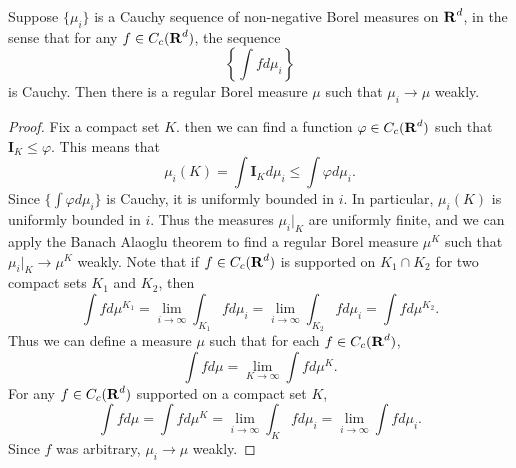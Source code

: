 \begin{lemma} \label{weakstarcompleteness}
	Suppose $\{ \mu_i \}$ is a Cauchy sequence of non-negative Borel measures on $\operatorname{\mathbf{R}}^d$, in the sense that for any $f \in C_c(\operatorname{\mathbf{R}}^d)$, the sequence
	\[ \left\{ \int f d\mu_i \right\} \]
	is Cauchy. Then there is a regular Borel measure $\mu$ such that $\mu_i \to \mu$ weakly.
\end{lemma}
\begin{proof}
	Fix a compact set $K$. then we can find a function $\varphi \in C_c(\operatorname{\mathbf{R}}^d)$ such that $\mathbf{I}_K \leq \varphi$. This means that
	\[ \mu_i(K) = \int \mathbf{I}_K d\mu_i \leq \int \varphi d\mu_i. \]
	Since $\{ \int \varphi d\mu_i \}$ is Cauchy, it is uniformly bounded in $i$. In particular, $\mu_i(K)$ is uniformly bounded in $i$. Thus the measures $\mu_i|_K$ are uniformly finite, and we can apply the Banach Alaoglu theorem to find a regular Borel measure $\mu^K$ such that $\mu_i|_K \to \mu^K$ weakly. Note that if $f \in C_c(\operatorname{\mathbf{R}}^d)$ is supported on $K_1 \cap K_2$ for two compact sets $K_1$ and $K_2$, then
	\[ \int f d\mu^{K_1} = \lim_{i \to \infty} \int_{K_1} f d\mu_i = \lim_{i \to \infty} \int_{K_2} f d \mu_i = \int f d\mu^{K_2}. \]
	Thus we can define a measure $\mu$ such that for each $f \in C_c(\operatorname{\mathbf{R}}^d)$,
	\[ \int f d\mu = \lim_{K \to \infty} \int f d\mu^K. \]
	For any $f \in C_c(\operatorname{\mathbf{R}}^d)$ supported on a compact set $K$,
	\[ \int f d\mu = \int f d\mu^K = \lim_{i \to \infty} \int_K f d\mu_i = \lim_{i \to \infty} \int f d\mu_i. \]
	Since $f$ was arbitrary, $\mu_i \to \mu$ weakly.
\end{proof}

\begin{comment}

\begin{lemma}
	For each $k$, let $\mathcal{E}_k$ be a finite collection of closed sets, such that for any $A \in \mathcal{E}_{k+1}$, we fix $A^* \in \mathcal{E}_k$ such that $A \subset A^*$. Suppose that for any $A' \in \mathcal{E}_k$, there is at least one $A \in \mathcal{E}_{k+1}$ such that $A^* = A'$. Let $f: \bigcup_k \mathcal{E}_k \to [0,\infty)$ be a function such that for any $A' \in \mathcal{E}_k$,
	\begin{equation} \label{equation73234091} \sum \{ f(A) : A^* = A' \} = f(A'). \end{equation}
	Then there exists a regular Borel measure $\mu$ supported on
	\[ \bigcap_{k = 1}^\infty \bigg\{ \overline{\bigcup \{ A : A \in \mathcal{E}_k : f(A) > 0 \}} \bigg\} \]
	such that for each $k$, and each $A \in \mathcal{E}_k$,
	\begin{equation} \label{massdissupperbound} \mu(A) \geq f(A), \end{equation}
	and for any Borel $E$,
	\begin{equation} \label{massdisslowerbound} \mu(E) \leq \sum f(A), \end{equation}
	where $A$ ranges over elements of $\mathcal{E}_k$ with $A \cap E \neq \emptyset$.
\end{lemma}

\end{comment}


